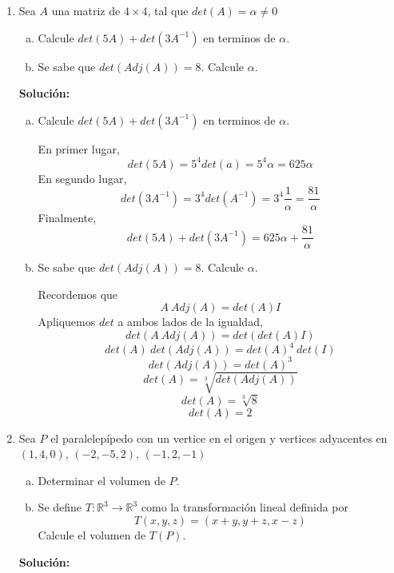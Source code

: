 \documentclass[12pt]{article}
\newenvironment{solucion}
{\begin{mdframed}[backgroundcolor=black!10]
		{\bf Solución:}\\
	}
	{
	\end{mdframed}
}
\newenvironment{preguntas}
{\begin{enumerate}\itemsep12pt
	}
	{
	\end{enumerate}
}
\newcommand{\ra}{\rightarrow}
\newcommand{\R}{\mathbb{R}}
\begin{document}
\begin{preguntas}
\item Sea $A$ una matriz de $4\times 4$, tal que $det(A) = \alpha \neq 0$
\begin{enumerate}[a)]
\item Calcule  $det(5A)+det(3A^{-1})$ en terminos de $\alpha$.
\item Se sabe que $det(Adj(A))=8$. Calcule $\alpha$.
\end{enumerate}
\begin{solucion}

\begin{enumerate}[a)]
\item Calcule  $det(5A)+det(3A^{-1})$ en terminos de $\alpha$.
			
			En primer lugar,
			$$det(5A) = 5^4det(a) = 5^4\alpha = 625 \alpha$$
			En segundo lugar,
			$$det(3A^{-1}) = 3^4det(A^{-1}) = 3^4 \dfrac{1}{\alpha} = \dfrac{81}{\alpha}$$
			Finalmente,
			$$det(5A)+det(3A^{-1}) = 625 \alpha + \dfrac{81}{\alpha}$$
\item Se sabe que $det(Adj(A))=8$. Calcule $\alpha$.
			
			Recordemos que
			$$A\ Adj(A) = det(A) I$$
			Apliquemos $det$ a ambos lados de la igualdad,
			$$det(A\ Adj(A)) = det(det(A) I)$$
			$$det(A)\ det(Adj(A)) = det(A)^4\ det(I)$$
			$$det(Adj(A)) = det(A)^3$$
			$$det(A) = \sqrt[3]{det(Adj(A))}$$
			$$det(A) = \sqrt[3]{8}$$
			$$det(A) = 2$$
\end{enumerate}
\end{solucion}
\item Sea $P$ el paralelepípedo con un vertice en el origen y vertices adyacentes en $(1,4,0)$, $(-2,-5,2)$, $(-1,2,-1)$
\begin{enumerate}[a)]
\item Determinar el volumen de $P$.
\item Se define $T: \R^3 \ra \R^3$ como la transformación lineal definida por $$T(x,y,z)=(x+y,y+z,x-z)$$
		Calcule el volumen de $T(P)$.
\end{enumerate}
\begin{solucion}


\end{solucion}
\end{preguntas}
\end{document}
